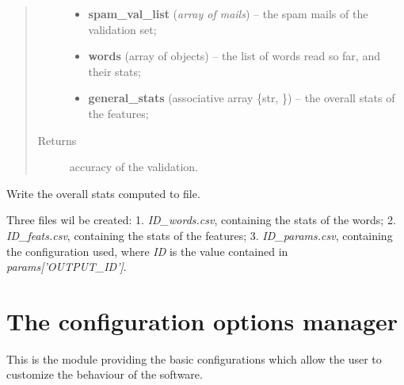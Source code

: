 \documentclass[letterpaper,10pt,english]{sphinxmanual}
\begin{document}
\begin{fulllineitems}
\begin{fulllineitems}
\begin{quote}
\begin{description}
\begin{itemize}
\item {} 
\textbf{spam\_val\_list} (\emph{array of mails}) -- the spam mails of the validation set;

\item {} 
\textbf{words} (array of {\hyperref[index:gen_stat.Word]{}} objects) -- the list of words read so far, and their stats;

\item {} 
\textbf{general\_stats} (associative array \{str, {\hyperref[index:gen_stat.Stat]{}}\}) -- the overall stats of the features;

\end{itemize}

\item[{Returns}] \leavevmode
accuracy of the validation.

\end{description}\end{quote}

\end{fulllineitems}


\begin{fulllineitems}
\label{index:naive_bayes.Bayes.write_bayes}
Write the overall stats computed to file.

Three files wil be created:
1. \emph{ID\_words.csv}, containing the stats of the words;
2. \emph{ID\_feats.csv}, containing the stats of the features;
3. \emph{ID\_params.csv}, containing the configuration used,
where \emph{ID} is the value contained in \emph{params{[}'OUTPUT\_ID'{]}}.

\end{fulllineitems}


\end{fulllineitems}



\section{The configuration options manager}
\label{index:the-configuration-options-manager}
This is the module providing the basic configurations which allow the user to customize the behaviour of the software.
\label{index:module-config}
\end{document}
